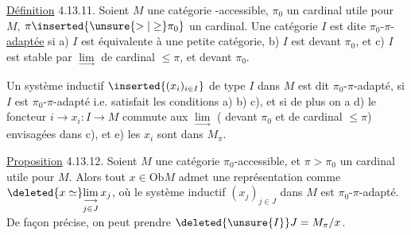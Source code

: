 

\uline{Définition} 4.13.11. Soient $M$ une catégorie -accessible, $\pi_0$ un cardinal utile pour $M$, $\pi\inserted{\unsure{>|\geq}\pi_0}$ un cardinal.  Une catégorie $I$ est dite $\pi_0$-$\pi$-\uline{adaptée} si a) $I$ est équivalente à une petite catégorie, b) $I$ est  devant $\pi_0$, et c) $I$ est stable par $\underset{\longrightarrow}{\lim}$ de cardinal $\leq\pi$, et  devant $\pi_0$.


Un système inductif $\inserted{(x_i)_{i\in I}}$ de type $I$ dans $M$ est dit $\pi_0$-$\pi$-adapté, si $I$ est $\pi_0$-$\pi$-adapté i.e. satisfait les conditions a) b) c), et si de plus on a d) le foncteur $i\longrightarrow x_i:I\longrightarrow M$ commute aux $\underset{\longrightarrow}{\lim}$ ( devant $\pi_0$ et de cardinal $\leq\pi$) envisagées dans c), et e) les $x_i$ sont dans $M_\pi$.

\uline{Proposition} 4.13.12. Soient $M$ une catégorie $\pi_0$-accessible, et $\pi>\pi_0$ un cardinal utile pour $M$. Alors tout $x\in\mathrm{Ob}M$ admet une représentation comme $\deleted{x\simeq}\underset{j\in J}{\underset{\longrightarrow}{\lim}}\,x_j$, où le système inductif $(x_j)_{j\in J}$ dans $M$ est $\pi_0$-$\pi$-adapté. De façon précise, on peut prendre $\deleted{\unsure{I}}J=M_\pi/x$.

